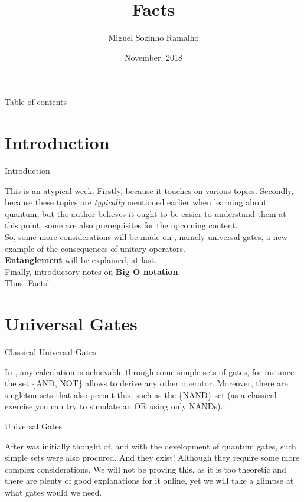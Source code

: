\documentclass[aspectratio=43]{beamer}
\title{\q Facts}
\date{November, 2018}
\author[Ramalho]{Miguel Sozinho Ramalho}
\begin{document}
\begin{frame}
	\titlepage
\end{frame}


\begin{frame}{Table of contents}
	\begin{card}
		\tableofcontents
	\end{card}
\end{frame}


\section{Introduction}
\begin{frame}{Introduction}
    \begin{card}
    This is an atypical week. Firstly, because it touches on various topics. Secondly, because these topics are \textit{typically} mentioned earlier when learning about quantum, but the author believes it ought to be easier to understand them at this point, some are also prerequisites for the upcoming content.\\
    So, some more considerations will be made on \textbf{\qcts}, namely universal gates, a new example of the consequences of unitary operators.\\ \textbf{Entanglement} will be explained, at last.\\ Finally, introductory notes on \textbf{Big O notation}.\\
    Thus: \q Facts!
    \end{card}
\pagenumber
\end{frame}

\section{Universal Gates}
\begin{frame}{Classical Universal Gates}
\begin{card}
    In \cc, any calculation is achievable through some simple sets of gates, for instance the set \{AND, NOT\} allows to derive any other operator. Moreover, there are singleton sets that also permit this, such as the \{NAND\} set (as a classical exercise you can try to simulate an OR using only NANDs).
\end{card}
\pagenumber
\end{frame}

\begin{frame}{\q Universal Gates}
\begin{card}
    After \qc was initially thought of, and with the development of quantum gates, such simple sets were also procured. And they exist! Although they require some more complex considerations. We will not be proving this, as it is too theoretic and there are plenty of good explanations for it online, yet we will take a glimpse at what gates would we need.
\end{card}
\pagenumber
\end{frame}
\end{document}
